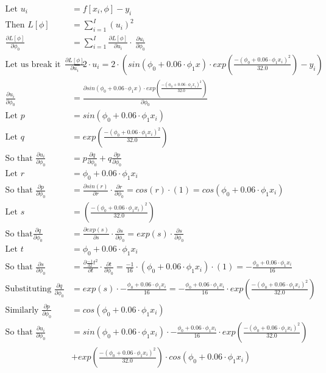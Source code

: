 \documentclass{article}
\begin{document}
\begin{align*}
\text{Let } u_i &= f[x_i, \phi]-y_i \\
\text{Then } L [\phi] &= \sum_{i=1}^{I} (u_i)^2 \\
\frac{\partial{L[\phi]}}{\partial{\phi_0}} &= \sum_{i=1}^{I}  \frac{\partial{L[\phi]}}{\partial{u_i}} \cdot \
 \frac{\partial{u_i}}{\partial{\phi_0}}
 \\
 \text{Let us break it down } \frac{\partial{L[\phi]}}{\partial{u_i}} &= 2 \cdot u_i = 2 \cdot \left( sin(\phi_0 + 0.06 \cdot \phi_1x) \cdot exp  \left( \frac{-(\phi_0 + 0.06 \cdot \phi_1x_i)^2}{32.0} \right) - y_i \right)
 \\
 \frac{\partial{u_i}}{\partial{\phi_0}} &= \frac{\partial{sin(\phi_0 + 0.06 \cdot \phi_1x) \cdot exp  \left( \frac{-(\phi_0 + 0.06 \cdot \phi_1x_i)^2}{32.0} \right)}}{\partial{\phi_0}} \\
 \text{Let } p &= sin(\phi_0 + 0.06 \cdot \phi_1x_i) \\
 \text{Let } q &= exp  \left( \frac{-(\phi_0 + 0.06 \cdot \phi_1x_i)^2}{32.0} \right) \\
 \text{So that } \frac{\partial{u_i}}{\partial{\phi_0}} &= p\frac{\partial{q}}{\partial{\phi_0}} + q \frac{\partial{p}}{\partial{\phi_0}}
 \\
 \text{Let } r &= \phi_0 + 0.06 \cdot \phi_1 x_i
 \\
 \text{So that } \frac{\partial{p}}{\partial{\phi_0}} &= \frac{\partial{sin(r)}}{\partial{r}} \cdot \frac{\partial{r}}{\partial{\phi_0}} = cos (r) \cdot (1) = cos(\phi_0 + 0.06\cdot \phi_1 x_i)
 \\
 \text{Let } s &= \left( \frac{-(\phi_0 + 0.06 \cdot \phi_1x_i)^2}{32.0} \right)
 \\
 \text{So that} \frac{\partial{q}}{\partial{\phi_0}} &= \frac{\partial{exp(s)}}{\partial{s}} \cdot \frac{\partial{s}}{\partial{\phi_0}} = exp(s) \cdot \frac{\partial{s}}{\partial{\phi_0}}
 \\
 \text{Let }t &= \phi_0 + 0.06 \cdot \phi_1x_i
 \\
 \text{So that } \frac{\partial{s}}{\partial{\phi_0}} &= \frac{\partial{\frac{-1}{32}}t^2}{\partial{t}} \cdot \frac{\partial{t}}{\partial{\phi_0}} = \frac{-1}{16} \cdot ( \phi_0 + 0.06 \cdot \phi_1x_i ) \cdot (1) = -\frac{\phi_0 + 0.06 \cdot \phi_1x_i}{16}
 \\
 \text{Substituting } \frac{\partial{q}}{\partial{\phi_0}} &= exp(s) \cdot  -\frac{\phi_0 + 0.06 \cdot \phi_1x_i}{16} = -\frac{\phi_0 + 0.06 \cdot \phi_1x_i}{16} \cdot exp \left( \frac{-(\phi_0 + 0.06 \cdot \phi_1x_i)^2}{32.0} \right)
 \\
 \text{Similarly } \frac{\partial{p}}{\partial{\phi_0}} &= cos(\phi_0 + 0.06\cdot \phi_1 x_i)
 \\
 \text{So that } \frac{\partial{u_i}}{\partial{\phi_0}} &= sin(\phi_0 + 0.06 \cdot \phi_1x_i) \cdot -\frac{\phi_0 + 0.06 \cdot \phi_1x_i}{16} \cdot exp \left( \frac{-(\phi_0 + 0.06 \cdot \phi_1x_i)^2}{32.0} \right) \\
 &+ exp  \left( \frac{-(\phi_0 + 0.06 \cdot \phi_1x_i)^2}{32.0} \right) \cdot cos(\phi_0 + 0.06\cdot \phi_1 x_i)
\end{align*}
\end{document}
